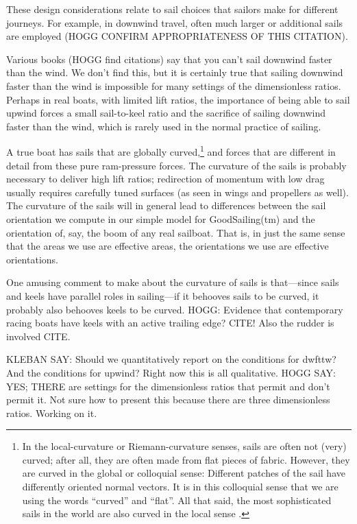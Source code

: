 \documentclass[letterpaper]{article}
\begin{document}
These design considerations relate to sail choices that sailors make for different journeys.
For example, in downwind travel, often much larger or additional sails are employed \cite{sails} (HOGG CONFIRM APPROPRIATENESS OF THIS CITATION).

Various books (HOGG find citations) say that you can't sail downwind faster than the wind.
We don't find this, but it is certainly true that sailing downwind faster than the wind is impossible for many settings of the dimensionless ratios.
Perhaps in real boats, with limited lift ratios, the importance of being able to sail upwind forces a small sail-to-keel ratio and the sacrifice of sailing downwind faster than the wind, which is rarely used in the normal practice of sailing.

A true boat has sails that are globally curved,\footnote{%
In the local-curvature or Riemann-curvature senses, sails are often not (very) curved; after all, they are often made from flat pieces of fabric.
However, they are curved in the global or colloquial sense: Different patches of the sail have differently oriented normal vectors.
It is in this colloquial sense that we are using the words ``curved'' and ``flat''.
All that said, the most sophisticated sails in the world are also curved in the local sense \cite{sails}.}
and forces that are different in detail from these pure ram-pressure forces.
The curvature of the sails is probably necessary to deliver high lift ratios; redirection of momentum with low drag usually requires carefully tuned surfaces (as seen in wings and propellers as well).
The curvature of the sails will in general lead to differences between the sail orientation we compute in our simple model for GoodSailing(tm) and the orientation of, say, the boom of any real sailboat.
That is, in just the same sense that the areas we use are effective areas, the orientations we use are effective orientations.

One amusing comment to make about the curvature of sails is that---since sails and keels have parallel roles in sailing---if it behooves sails to be curved, it probably also behooves keels to be curved.
HOGG: Evidence that contemporary racing boats have keels with an active trailing edge? CITE! Also the rudder is involved CITE.

KLEBAN SAY: Should we quantitatively report on the conditions for dwfttw? And the conditions for upwind? Right now this is all qualitative.
HOGG SAY: YES; THERE are settings for the dimensionless ratios that permit and don't permit it. Not sure how to present this because there are three dimensionless ratios. Working on it.
\end{document}
